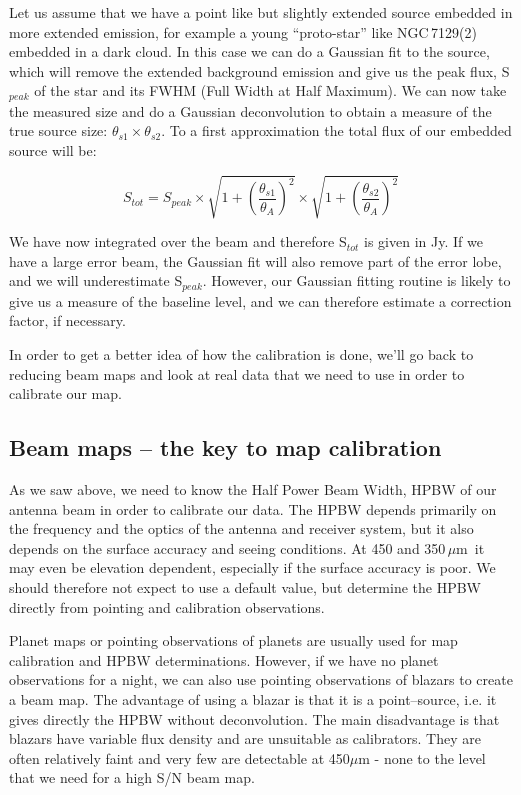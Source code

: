 \documentclass[twoside,11pt]{article}
\newcommand{\mic}{\mbox{\,${\mu}$m}}               %
\newcommand{\xlabel}[1]{}
\begin{document}
{Let us assume that we have a point like but slightly extended source
embedded in more extended emission, for example a young ``proto-star''
like NGC\,7129(2) embedded in a dark cloud. In this case we can do a
Gaussian fit to the source, which will remove the extended background
emission and give us the peak flux, S$_{peak}$ of the star and its FWHM
(Full Width at Half Maximum). We can now take the measured size and do
a Gaussian deconvolution to obtain a measure of the true source size:
$\theta_{s1} \times \theta_{s2}$. To a first approximation the total
flux of our embedded source will be:

\begin{equation}
S_{tot} = S_{peak} \times \sqrt{1 +
\left(\frac{\theta_{s1}}{\theta_A}\right)^2}
\times \sqrt{ 1 + \left(\frac{\theta_{s2}}{\theta_A}\right)^2}
\end{equation}

We have now integrated over the beam and therefore S$_{tot}$ is
given in Jy. If we have a large error beam, the Gaussian fit
will also remove part of the error lobe, and we will underestimate
S$_{peak}$. However, our Gaussian fitting routine is likely to give us a
measure of the baseline level, and we can therefore estimate a correction
factor, if necessary.

In order to get a better idea of how the calibration is done, we'll go
back to reducing beam maps and look at real data that we need to use in
order to calibrate our map.

\subsection{\xlabel{beam_maps_--_the_key_to_map_calibration}Beam maps -- the key to map calibration}

As we saw above,  we need to know the Half Power Beam Width, HPBW of our
antenna beam in order to calibrate our data. The HPBW depends primarily
on the frequency and the optics of the  antenna and receiver system,
but it also depends on the surface accuracy and seeing conditions. At
450 and 350\mic\ it may even be elevation dependent, especially if
the surface accuracy is poor.  We should therefore not expect to use
a default value, but determine the HPBW directly from pointing and
calibration  observations.

Planet maps or pointing observations of planets are usually used for
map calibration and HPBW determinations. However, if we have no planet
observations for a night, we can also use pointing observations of blazars
to create a beam map. The advantage of using a blazar is that it is a
point--source, i.e. it gives directly the HPBW without deconvolution. The
main disadvantage is that blazars have variable flux density and are
unsuitable as calibrators. They are often relatively faint and very few
are detectable at 450$\mu$m -  none to the level that we need for a high
S/N beam map.

}
\end{document}
